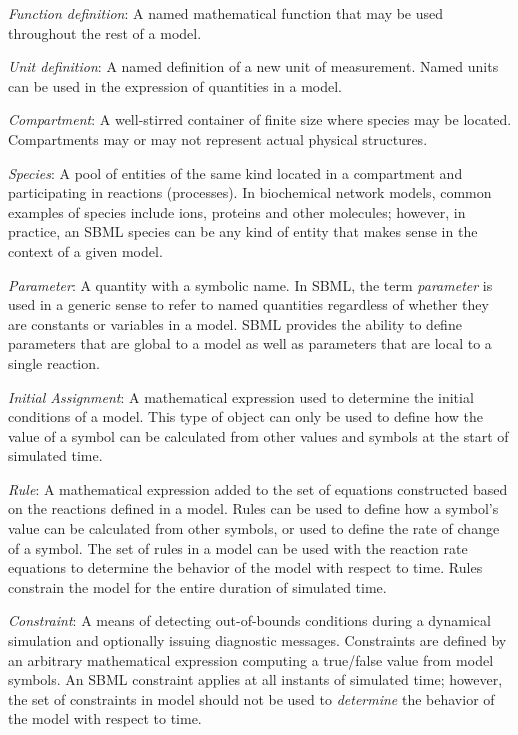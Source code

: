 \begin{description}
  
\item \emph{Function definition}: A named mathematical function
  that may be used throughout the rest of a model.

\item \emph{Unit definition}: A named definition of a new unit of
  measurement.  Named units can be used in the expression of
  quantities in a model.

\item \emph{Compartment}: A well-stirred container of finite size
  where species may be located.  Compartments may or may not
  represent actual physical structures.

\item \emph{Species}: A pool of entities of the same kind located
  in a compartment and participating in reactions (processes).  In
  biochemical network models, common examples of species include
  ions, proteins and other molecules; however, in practice, an
  SBML species can be any kind of entity that makes sense in the
  context of a given model.

\item \emph{Parameter}: A quantity with a symbolic name.  In SBML,
  the term \emph{parameter} is used in a generic sense to refer to
  named quantities regardless of whether they are constants or
  variables in a model.  SBML \thisL provides the ability to
  define parameters that are global to a model as well as
  parameters that are local to a single reaction.
  
\item \emph{Initial Assignment}: A mathematical
  expression used to determine the initial conditions of a
  model.  This type of object can only be used to define how
  the value of a symbol can be calculated from other values
  and symbols at the start of simulated time.
  
\item \emph{Rule}: A mathematical expression added to the set of
  equations constructed based on the reactions defined in a model.
  Rules can be used to define how a symbol's value can be
  calculated from other symbols, or used to define the rate of
  change of a symbol.  The set of rules in a model can be used
  with the reaction rate equations to determine the behavior of
  the model with respect to time.  Rules constrain the model for
  the entire duration of simulated time.

\item \emph{Constraint}: A means of detecting out-of-bounds
  conditions during a dynamical simulation and optionally issuing
  diagnostic messages.  Constraints are defined by an arbitrary
  mathematical expression computing a true/false value from model
  symbols.  An SBML constraint applies
  at all instants of simulated time; however, the set of
  constraints in model should not be used to \emph{determine} the
  behavior of the model with respect to time.
  

\end{description}
